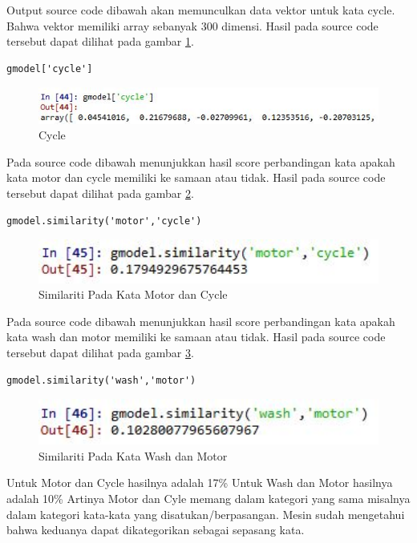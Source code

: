 \begin{enumerate}
\subitem Output source code dibawah akan memunculkan data vektor untuk kata cycle. Bahwa vektor memiliki array sebanyak 300 dimensi. Hasil pada source code tersebut dapat dilihat pada gambar \ref{c5_17}.
\begin{verbatim}
gmodel['cycle']
\end{verbatim}
\begin{figure}[!htbp]
\centerline{\includegraphics[width=1\textwidth]{figures/c5p/17.JPG}}
\caption{Cycle}
\label{c5_17}
\end{figure}
\subitem Pada source code dibawah menunjukkan hasil score perbandingan kata apakah kata motor dan cycle memiliki ke samaan atau tidak.  Hasil pada source code tersebut dapat dilihat pada gambar \ref{c5_18}.
\begin{verbatim}
gmodel.similarity('motor','cycle')
\end{verbatim}
\begin{figure}[!htbp]
\centerline{\includegraphics[width=1\textwidth]{figures/c5p/18.JPG}}
\caption{Similariti Pada Kata Motor dan Cycle}
\label{c5_18}
\end{figure}
\subitem Pada source code dibawah menunjukkan hasil score perbandingan kata apakah kata wash dan motor memiliki ke samaan atau tidak.  Hasil pada source code tersebut dapat dilihat pada gambar \ref{c5_19}.
\begin{verbatim}
gmodel.similarity('wash','motor')
\end{verbatim}
\begin{figure}[!htbp]
\centerline{\includegraphics[width=1\textwidth]{figures/c5p/19.JPG}}
\caption{Similariti Pada Kata Wash dan Motor}
\label{c5_19}
\end{figure}
\subitem Untuk Motor dan Cycle hasilnya adalah 17\%
\subitem Untuk Wash dan Motor hasilnya adalah 10\%
\subitem Artinya Motor dan Cyle memang dalam kategori yang sama misalnya dalam kategori kata-kata yang disatukan/berpasangan. Mesin sudah mengetahui bahwa keduanya dapat dikategorikan sebagai sepasang kata.

\end{enumerate}

